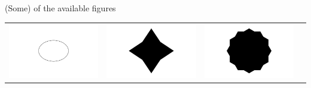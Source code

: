 \documentclass{beamer}
\begin{document}
\begin{frame}{(Some) of the available figures}
\begin{tabular}{c c c c}
			\includegraphics[width=0.2\linewidth]{img/ellipse.pdf} & 
			\includegraphics[width=0.2\linewidth]{img/ninja.pdf} & 
			\includegraphics[width=0.2\linewidth]{img/biscuit.pdf} \\
		\end{tabular}


\end{frame}
\end{document}
